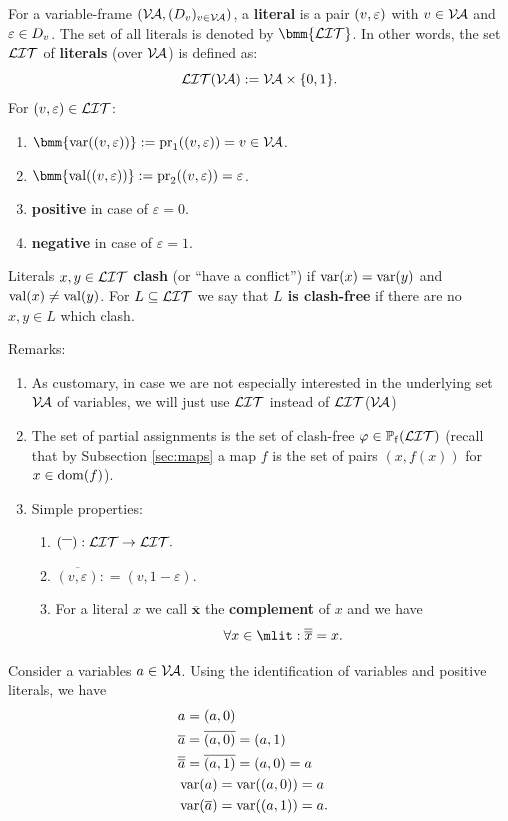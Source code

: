 \documentclass[12pt]{book}
\begin{document}
\begin{defi}\label{def:litdervar}
      For a variable-frame $(\mathcal{V\hspace{-0.1em}A}, (D_v)_{v \in \mathcal{V\hspace{-0.1em}A}})$, a \textbf{literal} is a pair $(v,\varepsilon)$ with $v \in \mathcal{V\hspace{-0.1em}A}$ and $\varepsilon \in D_v$. The set of all literals is denoted by 
	  $\bmm{\Lit}$. In other words, the set $\mathcal{LIT}$ of \textbf{literals} (over $\mathcal{V\hspace{-0.1em}A}$) is defined as:
      $$\mathcal{LIT}( \mathcal{V\hspace{-0.1em}A}): = \mathcal{V\hspace{-0.1em}A} \times \{0,1\}.$$
      For $(v,\varepsilon) \in \mathcal{LIT}$:
      \begin{enumerate}
            \item $\bmm{\var((v,\ve))} := \proj_1((v,\ve)) = v \in \Va$.
            \item $\bmm{\val((v,\ve))} := \proj_2((v,\ve)) = \ve$.
            \item \textbf{positive} in case of $\varepsilon = 0$.
            \item \textbf{negative} in case of $\varepsilon = 1$.
      \end{enumerate}
      Literals $x, y \in \mathcal{LIT}$ \textbf{clash} (or ``have a conflict'') if $\operatorname{var}(x) = \operatorname{var}(y)$ and $\operatorname{val}(x) \ne \operatorname{val}(y)$. For $L \subseteq \mathcal{LIT}$ we say that 
	  \textbf{$L$ is clash-free} if there are no $x, y \in L$ which clash.
\end{defi}
Remarks:
\begin{enumerate}
      \item As customary, in case we are not especially interested in the underlying set   $\mathcal{V\hspace{-0.1em}A}$ of variables, we will just use  $\mathcal{LIT}$ instead of $\mathcal{LIT}$($\mathcal{V\hspace{-0.1em}A}$)
      \item The set of partial assignments is the set of clash-free $\varphi \in \operatorname{\mathbb{P}_f}(\mathcal{LIT})$ (recall that by Subsection \ref{sec:maps} a map $f$ is the set of 
	  pairs $(x,f(x))$ for $x \in \operatorname{dom}(f)$).
      \item Simple properties:
      \begin{enumerate}
            \item $({}^{\overline{~~}}): \mathcal{LIT} \to  \mathcal{LIT}.$
            \item $\overline{(v, \varepsilon)}: = (v, 1-\varepsilon).$
            \item For a literal $x$ we call $\overline{{\bm x}}$ the \textbf{complement} of $x$ and we have
            $$\forall x \in \mlit: \overline{\overline{x}} = x.$$
      \end{enumerate}
\end{enumerate}
\begin{examp}\label{}
      Consider a variables $a\in  \mathcal{V\hspace{-0.1em}A}$. Using the identification of variables and positive literals, we have
      \begin{eqnarray*}
            &a = (a,0)& \\
            &\overline{a} = \overline{(a,0)} = (a,1)&\\
            &\overline{\overline{a}} = \overline{(a,1)} = (a,0) = a&\\
            &\operatorname{var}(a) = \operatorname{var}((a,0)) = a& \\
            &\operatorname{var}(\overline{a}) = \operatorname{var}((a,1)) = a. &
      \end{eqnarray*}
\end{examp}
\end{document}
